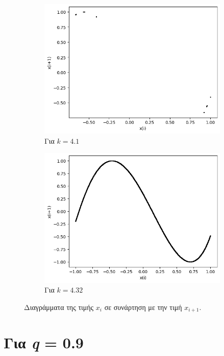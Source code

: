 \begin{figure}[ht]
\begin{subfigure}[b]{0.4\textwidth}
		\includegraphics[width=\textwidth]{LateX images/cheb q=0.8/g13}
		\caption{Για $k=4.1$}
		\label{f:k140}
	\end{subfigure}
	\hfill
	\begin{subfigure}[b]{0.4\textwidth}
	\centering
	\includegraphics[width=\textwidth]{LateX images/cheb q=0.8/g9}
	\caption{Για $k=4.32$}
	\label{f:k136}
\end{subfigure}
\hfill	
	\caption{Διαγράμματα της τιμής \(x_i\) σε συνάρτηση με την τιμή \(x_{i+1}\).}
	\label{f:k249}
\end{figure}

\clearpage

\section{Για \emph{q} = 0.9}

